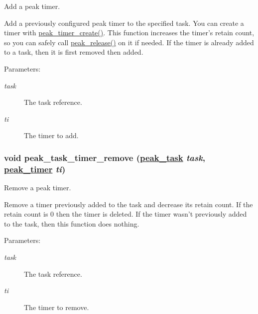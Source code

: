 Add a peak timer. 

Add a previously configured peak timer to the specified task. You can create a timer with \hyperlink{group__timer_ga9}{peak\_\-timer\_\-create()}. This function increases the timer's retain count, so you can safely call \hyperlink{group__alloc_ga7}{peak\_\-release()} on it if needed. If the timer is already added to a task, then it is first removed then added.

\begin{Desc}
\item[Parameters:]
\begin{description}
\item[{\em task}]The task reference. \item[{\em ti}]The timer to add. \end{description}
\end{Desc}
\hypertarget{group__task__timer_ga1}{
\subsubsection[peak\_\-task\_\-timer\_\-remove]{\setlength{\rightskip}{0pt plus 5cm}void peak\_\-task\_\-timer\_\-remove (\hyperlink{group__task__common_ga0}{peak\_\-task} {\em task}, \hyperlink{group__timer_ga0}{peak\_\-timer} {\em ti})}}
\label{group__task__timer_ga1}


Remove a peak timer. 

Remove a timer previously added to the task and decrease its retain count. If the retain count is 0 then the timer is deleted. If the timer wasn't previously added to the task, then this function does nothing.

\begin{Desc}
\item[Parameters:]
\begin{description}
\item[{\em task}]The task reference. \item[{\em ti}]The timer to remove. \end{description}
\end{Desc}
